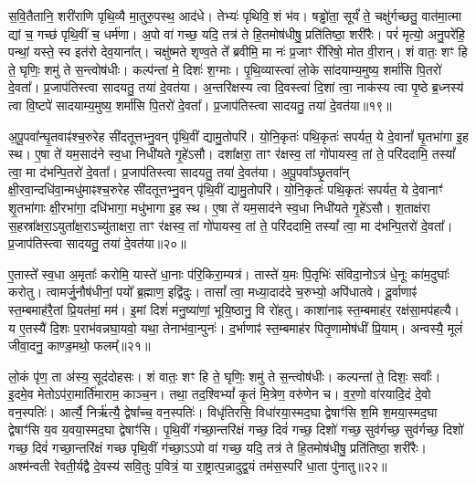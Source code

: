 स॒वि॒तैतानि॒ शरी॑राणि पृथि॒व्यै मा॒तुरु॒पस्थ॒ आद॑धे। 
तेभ्यः॑ पृथिवि॒ शं भ॑व। 
षड्ढो॑ता॒ सूर्यं॑ ते॒ चक्षु॑र्गच्छतु॒ वात॑मा॒त्मा द्यां च॒ गच्छ॑ पृथि॒वीं च॒ धर्म॑णा। 
अ॒पो वा॑ गच्छ॒ यदि॒ तत्र॑ ते हि॒तमोष॑धीषु॒ प्रति॑तिष्ठा॒ शरी॑रैः। 
परं॑ मृत्यो॒ अनु॒परे॑हि॒ पन्थां॒ यस्ते॒ स्व इत॑रो देव॒याना᳚त्। 
चक्षु॑ष्मते शृण्व॒ते ते᳚ ब्रवीमि॒ मा नः॑ प्र॒जाꣳ री॑रिषो॒ मोत वी॒रान्। 
शं वातः॒ शꣳ हि ते॒ घृणिः॒ शमु॑ ते स॒न्त्वोष॑धीः। 
कल्प॑न्तां मे॒ दिशः॑ श॒ग्माः। 
पृ॒थि॒व्यास्त्वा॑ लो॒के सा॑दयाम्य॒मुष्य॒ शर्मा॑सि पि॒तरो॑ दे॒वता᳚। 
प्र॒जाप॑तिस्त्वा सादयतु॒ तया॑ दे॒वत॑या। 
अ॒न्तरि॑क्षस्य त्वा दि॒वस्त्वा॑ दि॒शां त्वा॒ नाक॑स्य त्वा पृ॒ष्ठे ब्र॒ध्नस्य॑ त्वा वि॒ष्टपे॑ सादयाम्य॒मुष्य॒ शर्मा॑सि पि॒तरो॑ दे॒वता᳚। 
प्र॒जाप॑तिस्त्वा सादयतु॒ तया॑ दे॒वत॑या॥१९॥

अ॒पू॒पवा᳚न्घृ॒तवाꣴ॑श्च॒रुरेह सी॑दतूत्तभ्नु॒वन् पृ॑थि॒वीं द्यामु॒तोपरि॑। 
यो॒नि॒कृतः॑ पथि॒कृतः॑ सपर्यत॒ ये दे॒वानां᳚ घृ॒तभा॑गा इ॒ह स्थ। 
ए॒षा ते॑ यम॒साद॑ने स्व॒धा निधी॑यते गृ॒हे॑ऽसौ। 
दशा᳚क्षरा॒ ताꣳ र॑क्षस्व॒ तां गो॑पायस्व॒ तां ते॒ परि॑ददामि॒ तस्यां᳚ त्वा॒ मा द॑भन्पि॒तरो॑ दे॒वता᳚। 
प्र॒जाप॑तिस्त्वा सादयतु॒ तया॑ दे॒वत॑या। 
अ॒पू॒पवा᳚ञ्छृ॒तवा᳚न् क्षी॒रवा॒न्दधि॑वा॒न्मधु॑माꣴश्च॒रुरेह सी॑दतूत्तभ्नु॒वन् पृ॑थि॒वीं द्यामु॒तोपरि॑। 
यो॒नि॒कृतः॑ पथि॒कृतः॑ सपर्यत॒ ये दे॒वानाꣳ॑ शृ॒तभा॑गाः क्षी॒रभा॑गा॒ दधि॑भागा॒ मधु॑भागा इ॒ह स्थ। 
ए॒षा ते॑ यम॒साद॑ने स्व॒धा निधी॑यते गृ॒हे॑ऽसौ। 
श॒ताक्ष॑रा स॒हस्रा᳚क्षरा॒ऽयुता᳚क्ष॒राऽच्यु॑ताक्षरा॒ ताꣳ र॑क्षस्व॒ तां गो॑पायस्व॒ तां ते॒ परि॑ददामि॒ तस्यां᳚ त्वा॒ मा द॑भन्पि॒तरो॑ दे॒वता᳚। 
प्र॒जाप॑तिस्त्वा सादयतु॒ तया॑ दे॒वत॑या॥२०॥
\anuvakamend[अन॑पस्फुरन्ती॒रुत्त॑र दे॒वत॑या॒ द्वे च॑]

ए॒तास्ते᳚ स्व॒धा अ॒मृताः᳚ करोमि॒ यास्ते॑ धा॒नाः प॑रि॒किरा॒म्यत्र॑। 
तास्ते॑ य॒मः पि॒तृभिः॑ संविदा॒नोऽत्र॑ धे॒नूः का॑म॒दुघाः᳚ करोतु। 
त्वामर्जु॒नौष॑धीनां॒ पयो᳚ ब्र॒ह्माण॒ इद्वि॑दुः। 
तासां᳚ त्वा॒ मध्या॒दाद॑दे च॒रुभ्यो॒ अपि॑धातवे। 
दू॒र्वाणाꣴ॑ स्त॒म्बमाह॑रै॒तां प्रि॒यत॑मां॒ मम॑। 
इ॒मां दिशं॑ मनु॒ष्या॑णां॒ भूयि॒ष्ठानु॒ वि रो॑हतु। 
काशा॑नाꣴ स्त॒म्बमाह॑र॒ रक्ष॑सा॒मप॑हत्यै। 
य ए॒तस्यै॑ दि॒शः प॒राभ॑वन्नघा॒यवो॒ यथा॒ तेनाभ॑वा॒न्पुनः॑। 
द॒र्भाणाꣴ॑ स्त॒म्बमाह॑र पितृ॒णामोष॑धीं प्रि॒याम्। 
अन्वस्यै॒ मूलं॑ जीवा॒दनु॒ काण्ड॒मथो॒ फलम्᳚॥२१॥

लो॒कं पृ॑ण॒ ता अ॑स्य॒ सूद॑दोहसः। 
शं वातः॒ शꣳ हि ते॒ घृणिः॒ शमु॑ ते स॒न्त्वोष॑धीः। 
कल्पन्तां ते॒ दिशः॒ सर्वाः᳚। 
इ॒दमे॒व मेतोऽप॑रा॒मार्ति॑माराम॒ काञ्च॒न। 
तथा॒ तद॒श्विभ्यां᳚ कृ॒तं मि॒त्रेण॒ वरु॑णेन च। 
व॒र॒णो वा॑रयादि॒दं दे॒वो वन॒स्पतिः॑। 
आर्त्यै॒ निर्\mbox{}ऋ॑त्यै॒ द्वेषा᳚च्च॒ वन॒स्पतिः॑। 
विधृ॑तिरसि॒ विधा॑रया॒स्मद॒घा द्वेषाꣳ॑सि श॒मि श॒मया॒स्मद॒घा द्वेषाꣳ॑सि य॒व य॒वया॒स्मद॒घा द्वेषाꣳ॑सि। 
पृ॒थि॒वीं ग॑च्छा॒न्तरि॑क्षं गच्छ॒ दिवं॑ गच्छ॒ दिशो॑ गच्छ॒ सुव॑र्गच्छ॒ सुव॑र्गच्छ॒ दिशो॑ गच्छ॒ दिवं॑ गच्छा॒न्तरि॑क्षं गच्छ पृथि॒वीं ग॑च्छा॒ऽऽपो वा॑ गच्छ॒ यदि॒ तत्र॑ ते हि॒तमोष॑धीषु॒ प्रति॑तिष्ठा॒ शरी॑रैः। 
अश्म॑न्वती रेवती॒र्यद्वै दे॒वस्य॑ सवि॒तुः प॒वित्रं॒ या रा॒ष्ट्रात्प॒न्नादुद्व॒यं तम॑स॒स्परि॑ धा॒ता पु॑नातु॥२२॥
\anuvakamend[फलं॑ पुनातु]

